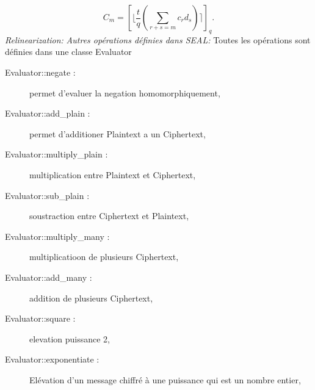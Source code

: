 \documentclass[a4paper,11pt]{report}
\begin{document}
$$C_m = [\lfloor\dfrac{t}{q}(\sum_{r+s=m}^{}c_rd_s)\rceil]_q.$$
\textit{Relinearization:}\newline
\newline
\textit{Autres opérations définies dans SEAL:}\newline
Toutes les opérations sont définies dans une classe Evaluator\newline
\begin{description}
 \item[Evaluator::negate :] permet d'evaluer la negation homomorphiquement,
 \item[Evaluator::add\_plain :] permet d'additioner Plaintext a un Ciphertext,
 \item[Evaluator::multiply\_plain :] multiplication entre Plaintext et Ciphertext,
 \item[Evaluator::sub\_plain :] soustraction entre Ciphertext et Plaintext,
 \item[Evaluator::multiply\_many :] multiplicatioon de plusieurs Ciphertext,
 \item[Evaluator::add\_many :] addition de plusieurs Ciphertext,
 \item[Evaluator::square :] elevation puissance 2,
 \item[Evaluator::exponentiate :] Elévation d'un message chiffré à une puissance qui est un nombre entier,
  \end{description}

\newpage
\end{document}
